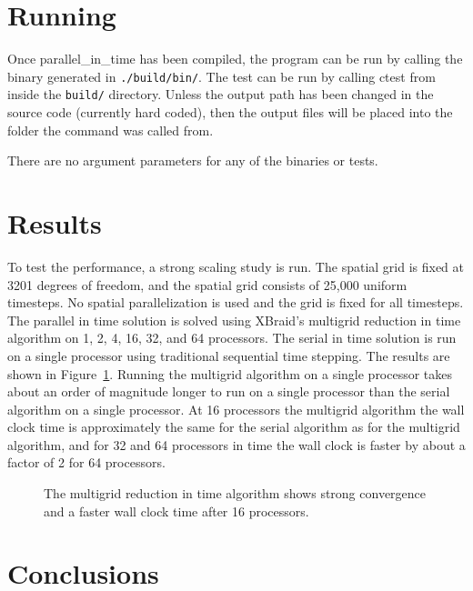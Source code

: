 \documentclass{article}
\begin{document}
\section{Running}\label{running}

Once parallel\_in\_time has been compiled, the program can be run by calling the binary generated in \texttt{./build/bin/}.
The test can be run by calling ctest from inside the \texttt{build/} directory.
Unless the output path has been changed in the source code (currently hard coded), then the output files will be placed into the folder the command was called from.

There are no argument parameters for any of the binaries or tests.

\section{Results}\label{results}

To test the performance, a strong scaling study is run.
The spatial grid is fixed at 3201 degrees of freedom, and the spatial grid consists of 25,000 uniform timesteps.
No spatial parallelization is used and the grid is fixed for all timesteps.
The parallel in time solution is solved using XBraid's multigrid reduction in time algorithm on 1, 2, 4, 16, 32, and 64 processors.
The serial in time solution is run on a single processor using traditional sequential time stepping.
The results are shown in Figure~\ref{fig:strongscaling}.
Running the multigrid algorithm on a single processor takes about an order of magnitude longer to run on a single processor than the serial algorithm on a single processor.
At 16 processors the multigrid algorithm the wall clock time is approximately the same for the serial algorithm as for the multigrid algorithm, and for 32 and 64 processors in time the wall clock is faster by about a factor of 2 for 64 processors.

\begin{figure}[htbp]
  \centering
  
  \caption{\label{fig:strongscaling}The multigrid reduction in time algorithm shows strong convergence and a faster wall clock time after 16 processors.}
\end{figure}

\section{Conclusions}\label{conclusions}
\end{document}
